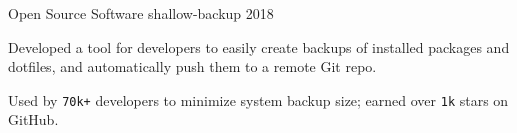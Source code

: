 \begin{cventries}


\cventry
{Open Source Software} %
{shallow-backup} %
{} %
{2018} %
{
	\begin{cvitems} %
		\item {Developed a tool for developers to easily create backups of installed packages and dotfiles, and automatically push them to a remote Git repo.}
		\item {Used by \texttt{70k+} developers to minimize system backup size; earned over \texttt{1k} stars on GitHub.}
	\end{cvitems}
}

\end{cventries}
